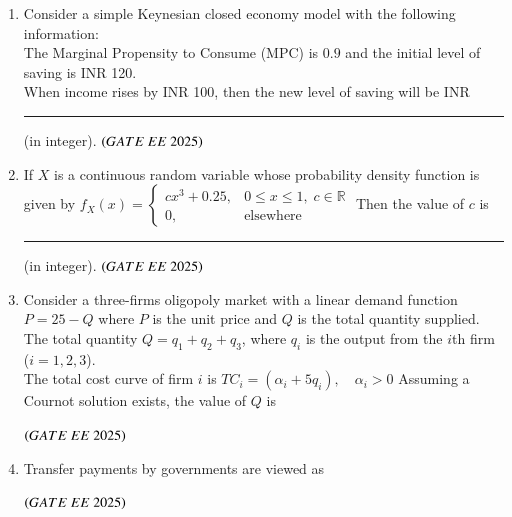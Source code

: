 \documentclass[journal,12pt,onecolumn]{IEEEtran}
\theoremstyle{remark}
\begin{document}
\begin{enumerate}
\item Consider a simple Keynesian closed economy model with the following information: \\
The Marginal Propensity to Consume (MPC) is $0.9$ and the initial level of saving is INR 120. \\
When income rises by INR 100, then the new level of saving will be INR \rule{2cm}{0.4pt} (in integer).
\hfill $\brak{GATE\ EE\ 2025}$

\item If $X$ is a continuous random variable whose probability density function is given by
$
f_X(x) =
\begin{cases}
cx^3 + 0.25, & 0 \leq x \leq 1, \; c \in \mathbb{R} \\
0, & \text{elsewhere}
\end{cases}
$
Then the value of $c$ is \rule{2cm}{0.4pt} (in integer).
\hfill $\brak{GATE\ EE\ 2025}$

\item Consider a three-firms oligopoly market with a linear demand function
$
P = 25 - Q
$
where $P$ is the unit price and $Q$ is the total quantity supplied. \\
The total quantity $Q = q_1 + q_2 + q_3$, where $q_i$ is the output from the $i$th firm ($i=1,2,3$). \\
The total cost curve of firm $i$ is
$
TC_i = (\alpha_i + 5q_i), \quad \alpha_i > 0
$
Assuming a Cournot solution exists, the value of $Q$ is
\begin{enumerate}
\end{enumerate}
\hfill $\brak{GATE\ EE\ 2025}$

\item Transfer payments by governments are viewed as
\begin{enumerate}
\end{enumerate}
\hfill $\brak{GATE\ EE\ 2025}$


\end{enumerate}
\end{document}
